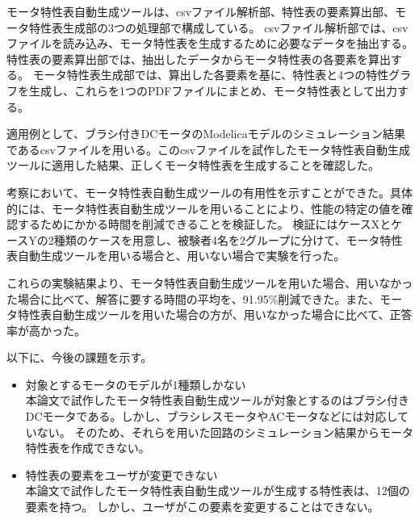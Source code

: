 \documentclass[uplatex, 10pt, a4p]{jsarticle}
\begin{document}
モータ特性表自動生成ツールは、csvファイル解析部、特性表の要素算出部、モータ特性表生成部の3つの処理部で構成している。
csvファイル解析部では、csvファイルを読み込み、モータ特性表を生成するために必要なデータを抽出する。特性表の要素算出部では、抽出したデータからモータ特性表の各要素を算出する。
モータ特性表生成部では、算出した各要素を基に、特性表と4つの特性グラフを生成し、これらを1つのPDFファイルにまとめ、モータ特性表として出力する。

適用例として、ブラシ付きDCモータのModelicaモデルのシミュレーション結果であるcsvファイルを用いる。このcsvファイルを試作したモータ特性表自動生成ツールに適用した結果、正しくモータ特性表を生成することを確認した。

考察において、モータ特性表自動生成ツールの有用性を示すことができた。具体的には、モータ特性表自動生成ツールを用いることにより、性能の特定の値を確認するためにかかる時間を削減できることを検証した。
検証にはケースXとケースYの2種類のケースを用意し、被験者4名を2グループに分けて、モータ特性表自動生成ツールを用いる場合と、用いない場合で実験を行った。

これらの実験結果より、モータ特性表自動生成ツールを用いた場合、用いなかった場合に比べて、解答に要する時間の平均を、91.95\%削減できた。また、モータ特性表自動生成ツールを用いた場合の方が、用いなかった場合に比べて、正答率が高かった。



以下に、今後の課題を示す。

\begin{itemize}
    \item 対象とするモータのモデルが1種類しかない\\
    本論文で試作したモータ特性表自動生成ツールが対象とするのはブラシ付きDCモータである。しかし、ブラシレスモータやACモータなどには対応していない。
    そのため、それらを用いた回路のシミュレーション結果からモータ特性表を作成できない。

\item 特性表の要素をユーザが変更できない\\
      本論文で試作したモータ特性表自動生成ツールが生成する特性表は、12個の要素を持つ。
      しかし、ユーザがこの要素を変更することはできない。

\end{itemize}



\end{document}
